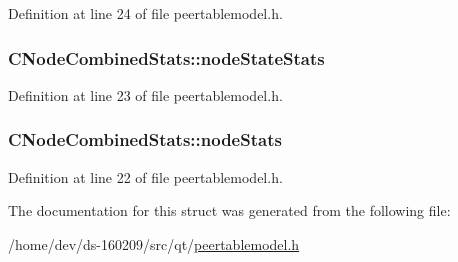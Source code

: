 Definition at line 24 of file peertablemodel.\+h.

\hypertarget{struct_c_node_combined_stats_a6ce7320fa9ca5a3706ec4caf76ac34a1}{}
\subsubsection[{node\+State\+Stats}]{ C\+Node\+Combined\+Stats\+::node\+State\+Stats}\label{struct_c_node_combined_stats_a6ce7320fa9ca5a3706ec4caf76ac34a1}


Definition at line 23 of file peertablemodel.\+h.

\hypertarget{struct_c_node_combined_stats_ad26d590ef79b08623b2b6658b59e9a69}{}
\subsubsection[{node\+Stats}]{ C\+Node\+Combined\+Stats\+::node\+Stats}\label{struct_c_node_combined_stats_ad26d590ef79b08623b2b6658b59e9a69}


Definition at line 22 of file peertablemodel.\+h.



The documentation for this struct was generated from the following file\+:\begin{DoxyCompactItemize}
\item 
/home/dev/ds-\/160209/src/qt/\hyperlink{peertablemodel_8h}{peertablemodel.\+h}\end{DoxyCompactItemize}
